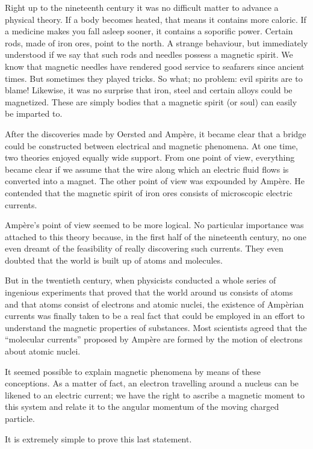 Right up to the nineteenth century it was no difficult matter to advance a physical theory. If a body becomes heated, that means it contains more caloric. If a medicine makes you fall asleep sooner, it contains a soporific power. Certain rods, made of iron ores, point to the north. A strange behaviour, but immediately understood if we say that such rods and needles possess a magnetic spirit. We know that magnetic needles have rendered good service to seafarers since ancient times. But sometimes they played tricks. So what; no problem: evil spirits are to blame! Likewise, it was no surprise that iron, steel and certain alloys could be magnetized. These are simply bodies that a magnetic spirit (or soul) can easily be imparted to.

After the discoveries made by Oersted and Amp\`ere, it became clear that a bridge could be constructed between electrical and magnetic phenomena. At one time, two theories enjoyed equally wide support. From one point of view, everything became clear if we assume that the wire along which an electric fluid flows is converted into a magnet. The other point of view was expounded by Amp\`ere. He contended that the magnetic spirit of iron ores consists of microscopic electric currents.

Amp\`ere's point of view seemed to be more logical. No particular importance was attached to this theory because, in the first half of the nineteenth century, no one even dreamt of the feasibility of really discovering such currents. They even doubted that the world is built up of atoms and molecules.

But in the twentieth century, when physicists conducted a whole series of ingenious experiments that proved that the world around us consists of atoms and that atoms consist of electrons and atomic nuclei, the existence of Amp\`erian currents was finally taken to be a real fact that could be employed in an effort to understand the magnetic properties of substances. Most scientists agreed that the ``molecular currents'' proposed by Amp\`ere are formed by the motion of electrons about atomic nuclei.

It seemed possible to explain magnetic phenomena by means of these conceptions. As a matter of fact, an electron travelling around a nucleus can be likened to an electric current; we have the right to ascribe a magnetic moment to this system and relate it to the angular momentum of the moving charged particle.


It is extremely simple to prove this last statement.

